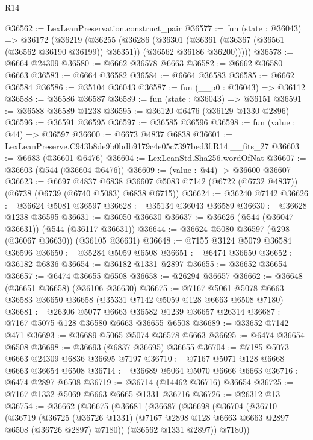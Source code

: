 \begin{lexlean}{R14}
\begin{coremodule}
@36562 := LexLeanPreservation.construct_pair
@36577 := fun (state : @36043) =>
  @36172
    (@36219
      (@36255
        (@36286
          (@36301
            (@36361 (@36367 (@36561 (@36562 @36190 @36199)) @36351))
            (@36562 @36186 @36200)))))
@36578 := @6664 @24309
@36580 := @6662 @36578 @6663
@36582 := @6662 @36580 @6663
@36583 := @6664 @36582
@36584 := @6664 @36583
@36585 := @6662 @36584
@36586 := @35104 @36043
@36587 := fun (__p0 : @36043) => @36112
@36588 := @36586 @36587
@36589 := fun (state : @36043) => @36151
@36591 := @36588 @36589 @1238
@36595 := @36120 @6476 (@36129 @1330 @2896)
@36596 := @36591 @36595
@36597 := @36585 @36596
@36598 := fun (value : @44) => @36597
@36600 := @6673 @4837 @6838
@36601 := LexLeanPreserve.C943b8de9b0bdb9179c4e05c7397bed3f.R14.__fits_27
@36603 := @6683 (@36601 @6476)
@36604 := LexLeanStd.Sha256.wordOfNat
@36607 := @36603 (@544 (@36604 @6476))
@36609 := (value : @44) -> @36600 @36607
@36623 := @6697
    @4837
    @6838
    @36607
    @5083
    @7142
    (@6722 (@6732 @4837))
    (@6738 (@6739 (@6740 @5083) @6838 @6715))
@36624 := @36240 @7142
@36626 := @36624 @5081 @36597
@36628 := @35134 @36043 @36589
@36630 := @36628 @1238 @36595
@36631 := @36050 @36630
@36637 := @36626 (@544 (@36047 @36631)) (@544 (@36117 @36631))
@36644 := @36624 @5080 @36597 (@298 (@36067 @36630)) (@36105 @36631)
@36648 := @7155 @3124 @5079 @36584 @36596
@36650 := @35284 @5059 @6508
@36651 := @6474 @36650
@36652 := @36182 @6836
@36654 := @36182 @1331 @2897
@36655 := @36652 @36654
@36657 := @6474 @36655 @6508
@36658 := @26294 @36657
@36662 := @36648 (@36651 @36658) (@36106 @36630)
@36675 := @7167 @5061 @5078 @6663 @36583 @36650 @36658 (@35331 @7142 @5059 @128 @6663 @6508 @7180)
@36681 := @26306 @5077 @6663 @36582 @1239 @36657 @26314
@36687 := @7167 @5075 @128 @36580 @6663 @36655 @6508
@36689 := @33652 @7142 @471
@36693 := @36689 @5065 @5074 @36578 @6663
@36695 := @6474 @36654 @6508
@36698 := @36693 (@6837 @36695) @36655
@36704 := @7185 @5073 @6663 @24309 @6836 @36695 @7197
@36710 := @7167 @5071 @128 @6668 @6663 @36654 @6508
@36714 := @36689 @5064 @5070 @6666 @6663
@36716 := @6474 @2897 @6508
@36719 := @36714 (@14462 @36716) @36654
@36725 := @7167 @1332 @5069 @6663 @6665 @1331 @36716
@36726 := @26312 @13
@36754 := @36662
    (@36675
      (@36681
        (@36687
          (@36698
            (@36704
              (@36710
                (@36719
                  (@36725
                    (@36726 @1331)
                    (@7167 @2898 @128 @6663 @6663 @2897 @6508 (@36726 @2897) @7180))
                  (@36562 @1331 @2897))
                @7180))

\end{coremodule}
\end{lexlean}
